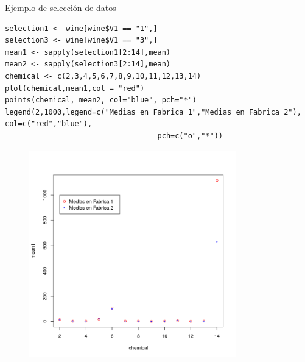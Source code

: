 \documentclass[xcolor=table]{beamer}
\begin{document}
\begin{frame}[fragile]{Ejemplo de selección de datos}

\begin{lstlisting}
selection1 <- wine[wine$V1 == "1",]
selection3 <- wine[wine$V1 == "3",]
mean1 <- sapply(selection1[2:14],mean)
mean2 <- sapply(selection3[2:14],mean)
chemical <- c(2,3,4,5,6,7,8,9,10,11,12,13,14)
plot(chemical,mean1,col = "red")
points(chemical, mean2, col="blue", pch="*")
legend(2,1000,legend=c("Medias en Fabrica 1","Medias en Fabrica 2"), col=c("red","blue"),
                                   pch=c("o","*"))
\end{lstlisting}

\begin{figure}
\centering
\includegraphics[width=0.8\textwidth]{means.png}
\end{figure}
\end{frame}
\end{document}
